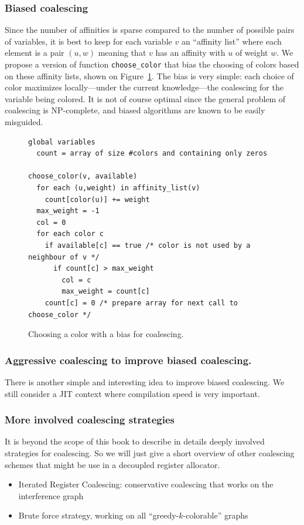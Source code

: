 {\subsubsection{Biased coalescing}

Since the number of affinities is sparse compared to the number of possible pairs of variables,
it is best to keep for each variable $v$ an ``affinity list'' where each element is a pair $(u,w)$ meaning that $v$ has an affinity with $u$ of weight $w$.
We propose a version of function {\tt choose\_color} that bias the choosing of colors based on these affinity lists, shown on Figure~\ref{code:choose-color}. 
The bias is very simple: each choice of color maximizes locally---under the current knowledge---the coalescing for the variable being colored. 
It is not of course optimal since the general problem of coalescing is NP-complete, and biased algorithms are known to be easily misguided. 


\begin{figure}
  \begin{verbatim}
global variables
  count = array of size #colors and containing only zeros

choose_color(v, available)
  for each (u,weight) in affinity_list(v)
    count[color(u)] += weight
  max_weight = -1
  col = 0
  for each color c
    if available[c] == true /* color is not used by a neighbour of v */
      if count[c] > max_weight
        col = c
        max_weight = count[c]
    count[c] = 0 /* prepare array for next call to choose_color */
  \end{verbatim}
  \caption{Choosing a color with a bias for coalescing.}
  \label{code:choose-color}
\end{figure}


\subsubsection{Aggressive coalescing to improve biased coalescing.}

There is another simple and interesting idea to improve biased coalescing. We 
still consider a JIT context where compilation speed is very important.


\subsubsection{More involved coalescing strategies}

It is beyond the scope of this book to describe in details deeply involved strategies for coalescing.
So we will just give a short overview of other coalescing schemes that might be use in a decoupled register allocator.
\begin{itemize}
  \item Iterated Register Coalescing: conservative coalescing that works on the interference graph
  \item Brute force strategy, working on all ``greedy-$k$-colorable'' graphs
\end{itemize}




}
